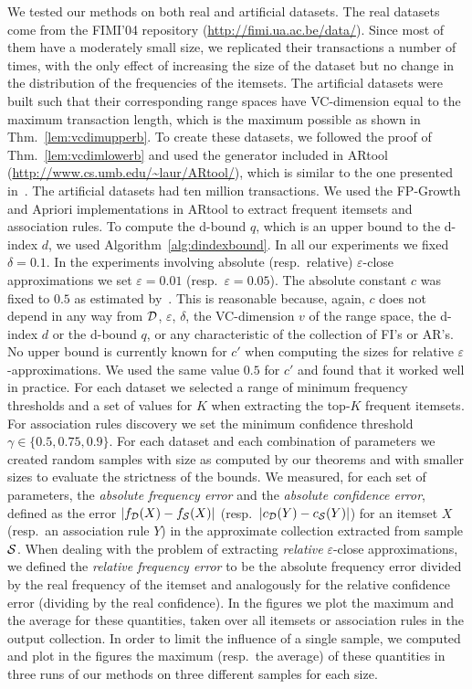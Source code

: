 We tested our methods on both real and artificial datasets. The real datasets
come from the FIMI'04 repository (\url{http://fimi.ua.ac.be/data/}). Since most
of them have a moderately small size, we replicated their transactions a number
of times, with the only effect of increasing the size of the dataset but no
change in the distribution of the frequencies of the itemsets. The artificial
datasets were built such that their corresponding range spaces
have VC-dimension equal to the maximum transaction length, which is the
maximum possible as shown in Thm.~\ref{lem:vcdimupperb}. To create these
datasets, we followed the proof of Thm.~\ref{lem:vcdimlowerb} and used the
generator included in ARtool (\url{http://www.cs.umb.edu/~laur/ARtool/}), which
is similar to the one presented in~\cite{AgrawalS94}. The artificial datasets
had ten million transactions. We used the FP-Growth and
Apriori implementations in ARtool to extract frequent itemsets and association
rules. To compute the d-bound $q$, which is an upper bound to the d-index $d$,
we used Algorithm~\ref{alg:dindexbound}.
In all our experiments we fixed $\delta=0.1$. In the experiments involving
absolute (resp.~relative) $\varepsilon$-close approximations we set
$\varepsilon=0.01$ (resp.~$\varepsilon=0.05$). The absolute constant $c$ was fixed to
$0.5$ as %
estimated by~\cite{LofflerP09}. This is reasonable because, again, $c$
does not depend in any way from ${\cal D}$, $\varepsilon$, $\delta$, the VC-dimension
$v$ of the range space, the d-index $d$ or the d-bound $q$, or any
characteristic of the collection of FI's or AR's. No upper bound is currently
known for $c'$ when computing the sizes for relative
$\varepsilon$-approximations. We used the same value $0.5$ for $c'$ and
found that it worked well in practice. For each dataset we selected a
range of minimum frequency thresholds and a set of values for $K$ when
extracting the top-$K$ frequent itemsets. For association rules discovery we set
the minimum confidence threshold $\gamma\in\{0.5, 0.75, 0.9\}$. For each
dataset and each combination of parameters we created random samples with size
as computed by our theorems and with smaller sizes to evaluate the strictness
of the bounds.  
We measured, for each set of parameters, the \emph{absolute
frequency error} and the \emph{absolute confidence error}, defined 
as  the error
$|f_{\cal D}(X)-f_{\cal S}(X)|$ (resp.~$|c_{\cal D}(Y)-c_{\cal S}(Y)|$) for an itemset $X$
(resp.~an association rule $Y$) in the approximate collection extracted from sample ${\cal S}$.
When dealing with the
problem of extracting \emph{relative} $\varepsilon$-close approximations, we
defined the \emph{relative frequency error} to be the absolute
frequency error divided by the real frequency of the itemset and analogously for
the relative confidence error (dividing by the real confidence). In the figures
we plot the maximum and the average for these quantities, taken over all
itemsets or association rules in the output collection. In order to limit the
influence of a single sample, we computed and plot in the figures the maximum
(resp.~the average) of these quantities in three runs of our methods on three
different samples for each size.

